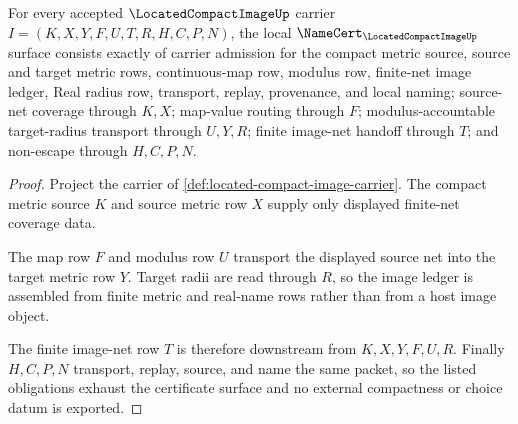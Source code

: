 \begin{theorem}
\label{thm:located-compact-image-namecert-obligations}
For every accepted $\LocatedCompactImageUp$ carrier $I=(K,X,Y,F,U,T,R,H,C,P,N)$, the local $\NameCert_{\LocatedCompactImageUp}$ surface consists exactly of carrier admission for the compact metric source, source and target metric rows, continuous-map row, modulus row, finite-net image ledger, Real radius row, transport, replay, provenance, and local naming; source-net coverage through $K,X$; map-value routing through $F$; modulus-accountable target-radius transport through $U,Y,R$; finite image-net handoff through $T$; and non-escape through $H,C,P,N$.
\end{theorem}
\begin{proof}
Project the carrier of \autoref{def:located-compact-image-carrier}. The compact metric source $K$ and source metric row $X$ supply only displayed finite-net coverage data.

The map row $F$ and modulus row $U$ transport the displayed source net into the target metric row $Y$. Target radii are read through $R$, so the image ledger is assembled from finite metric and real-name rows rather than from a host image object.

The finite image-net row $T$ is therefore downstream from $K,X,Y,F,U,R$. Finally $H,C,P,N$ transport, replay, source, and name the same packet, so the listed obligations exhaust the certificate surface and no external compactness or choice datum is exported.
\end{proof}

